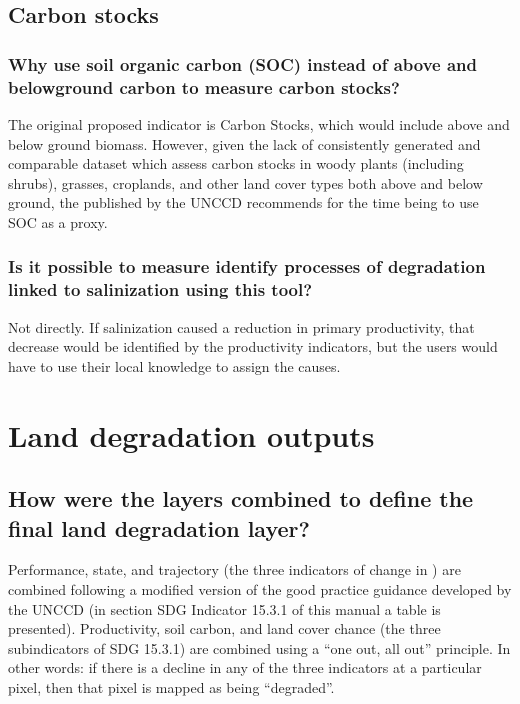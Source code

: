 \documentclass[letterpaper,10pt,english]{sphinxmanual}
\begin{document}
\subsection{Carbon stocks}
\label{\detokenize{Introduction/faq:carbon-stocks}}

\subsubsection{Why use soil organic carbon (SOC) instead of above and below\sphinxhyphen{}ground carbon to  measure carbon stocks?}
\label{\detokenize{Introduction/faq:why-use-soil-organic-carbon-soc-instead-of-above-and-below-ground-carbon-to-measure-carbon-stocks}}
\sphinxAtStartPar
The original proposed indicator is Carbon Stocks, which would include above and
below ground biomass. However, given the lack of consistently generated and
comparable dataset which assess carbon stocks in woody plants (including
shrubs), grasses, croplands, and other land cover types both above and below
ground, the 
published by the UNCCD recommends for the time being to use SOC as a proxy.


\subsubsection{Is it possible to measure identify processes of degradation linked to salinization using this tool?}
\label{\detokenize{Introduction/faq:is-it-possible-to-measure-identify-processes-of-degradation-linked-to-salinization-using-this-tool}}
\sphinxAtStartPar
Not directly. If salinization caused a reduction in primary productivity, that
decrease would be identified by the productivity indicators, but the users
would have to use their local knowledge to assign the causes.


\section{Land degradation outputs}
\label{\detokenize{Introduction/faq:land-degradation-outputs}}

\subsection{How were the layers combined to define the final land degradation layer?}
\label{\detokenize{Introduction/faq:how-were-the-layers-combined-to-define-the-final-land-degradation-layer}}
\sphinxAtStartPar
Performance, state, and trajectory (the three indicators of change in
{\hyperref[\detokenize{Introduction/faq:productivity}]{}}) are combined following a modified version of the good practice
guidance developed by the UNCCD (in section SDG Indicator 15.3.1 of this manual
a table is presented). Productivity, soil carbon, and land cover chance (the
three sub\sphinxhyphen{}indicators of SDG 15.3.1) are combined using a “one out, all out”
principle. In other words: if there is a decline in any of the three indicators
at a particular pixel, then that pixel is mapped as being “degraded”.
\end{document}
